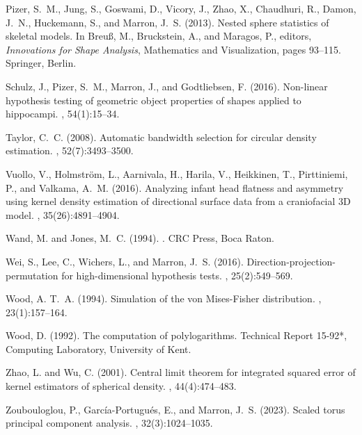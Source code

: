 \documentclass[oneside,11pt]{article}
\begin{document}
\begin{thebibliography}{}
	Pizer, S.~M., Jung, S., Goswami, D., Vicory, J., Zhao, X., Chaudhuri, R.,
	Damon, J.~N., Huckemann, S., and Marron, J.~S. (2013).
	\newblock Nested sphere statistics of skeletal models.
	\newblock In Breu{\ss}, M., Bruckstein, A., and Maragos, P., editors, {\em
		Innovations for Shape Analysis}, Mathematics and Visualization, pages
	93--115. Springer, Berlin.

	Schulz, J., Pizer, S.~M., Marron, J., and Godtliebsen, F. (2016).
	\newblock Non-linear hypothesis testing of geometric object properties of
	shapes applied to hippocampi.
	, 54(1):15--34.

	Taylor, C.~C. (2008).
	\newblock Automatic bandwidth selection for circular density estimation.
	, 52(7):3493--3500.

	Vuollo, V., Holmstr\"om, L., Aarnivala, H., Harila, V., Heikkinen, T.,
	Pirttiniemi, P., and Valkama, A.~M. (2016).
	\newblock Analyzing infant head flatness and asymmetry using kernel density
	estimation of directional surface data from a craniofacial 3{D} model.
	, 35(26):4891--4904.

	Wand, M. and Jones, M.~C. (1994).
	.
	\newblock CRC Press, Boca Raton.

	Wei, S., Lee, C., Wichers, L., and Marron, J.~S. (2016).
	\newblock Direction-projection-permutation for high-dimensional hypothesis
	tests.
	, 25(2):549--569.

	Wood, A. T.~A. (1994).
	\newblock Simulation of the von {M}ises-{F}isher distribution.
	, 23(1):157--164.

	Wood, D. (1992).
	\newblock The computation of polylogarithms.
	\newblock Technical Report 15-92*, Computing Laboratory, University of Kent.

	Zhao, L. and Wu, C. (2001).
	\newblock Central limit theorem for integrated squared error of kernel
	estimators of spherical density.
	, 44(4):474--483.

	Zoubouloglou, P., Garc\'ia-Portugu\'es, E., and Marron, J.~S. (2023).
	\newblock Scaled torus principal component analysis.
	, 32(3):1024--1035.

\end{thebibliography}
\end{document}
